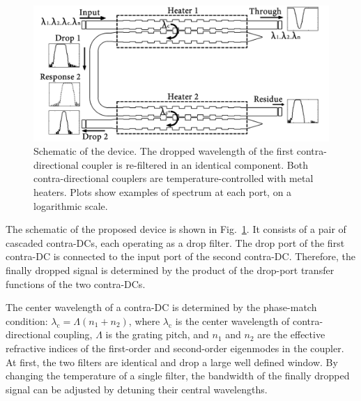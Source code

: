 \documentclass[9pt,twocolumn,twoside]{osajnl}
\begin{document}
\begin{figure}[htbp]
	\centering
	\includegraphics[width=1.00\columnwidth]{data/CascadedSchematic2}
	\centering
	\caption{Schematic of the device. 
	The dropped wavelength of the first contra-directional coupler is re-filtered in an identical component. 
	Both contra-directional couplers are temperature-controlled with metal heaters. 
	Plots show examples of spectrum at each port, on a logarithmic scale.}
	\label{fig:schematic}
\end{figure}

The schematic of the proposed device is shown in Fig.~\ref{fig:schematic}. 
It consists of a pair of cascaded contra-DCs, each operating as a drop filter. 
The drop port of the first contra-DC is connected to the input port of the second contra-DC. 
Therefore, the finally dropped signal is determined by the product of the  drop-port transfer functions of the two contra-DCs. 

The center wavelength of a contra-DC is determined by the phase-match condition: $\lambda_\text{c} = \Lambda (n_\text{1}+n_\text{2})$, where $\lambda_\text{c}$ is the center wavelength of contra-directional coupling, $\Lambda$ is the grating pitch, and $n_\text{1}$ and $n_\text{2}$ are the effective refractive indices of the first-order and second-order eigenmodes in the coupler. 
At first, the two filters are identical and drop a large well defined window. By changing the temperature of a single filter, the bandwidth of the finally dropped signal can be adjusted by detuning their central wavelengths.
\end{document}
